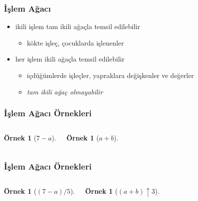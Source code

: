 \documentclass[dvipsnames]{beamer}
\theoremstyle{definition}
\theoremstyle{example}
\newtheorem{ornek}[theorem]{Örnek}
\theoremstyle{plain}
\begin{document}
\begin{frame}
  \frametitle{İşlem Ağacı}

  \begin{itemize}
    \item ikili işlem tam ikili ağaçla temsil edilebilir
    \begin{itemize}
      \item kökte işleç, çocuklarda işlenenler
    \end{itemize}

    \pause
    \medskip
    \item her işlem ikili ağaçla temsil edilebilir
    \begin{itemize}
      \item içdüğümlerde işleçler, yapraklara değişkenler ve değerler
      \item \emph{tam ikili ağaç olmayabilir}
    \end{itemize}
  \end{itemize}
\end{frame}

\begin{frame}
  \frametitle{İşlem Ağacı Örnekleri}

  \begin{columns}[t]
    \begin{ornek}[$7-a$]
      \begin{center}
      \end{center}
    \end{ornek}

    \begin{ornek}[$a+b$]
      \begin{center}
      \end{center}
    \end{ornek}
  \end{columns}
\end{frame}

\begin{frame}
  \frametitle{İşlem Ağacı Örnekleri}

  \begin{columns}[t]
    \begin{ornek}[$(7-a)/5$]
      \begin{center}
      \end{center}
    \end{ornek}

    \begin{ornek}[$(a+b) \uparrow 3$]
      \begin{center}
      \end{center}
    \end{ornek}
  \end{columns}
\end{frame}
\end{document}
